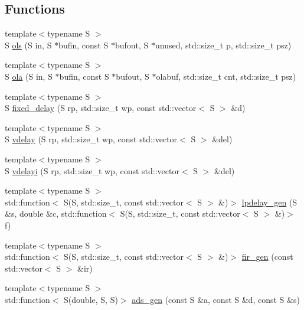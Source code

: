 \subsection*{Functions}
\begin{DoxyCompactItemize}
\item 
{\footnotesize template$<$typename S $>$ }\\S \hyperlink{namespace_aurora_a7ec189488ba66508d8df1c1670823365}{ols} (S in, S $\ast$bufin, const S $\ast$bufout, S $\ast$unused, std\+::size\+\_\+t p, std\+::size\+\_\+t psz)
\item 
{\footnotesize template$<$typename S $>$ }\\S \hyperlink{namespace_aurora_a8617b2b6ccb5009afc6b66c97435354f}{ola} (S in, S $\ast$bufin, const S $\ast$bufout, S $\ast$olabuf, std\+::size\+\_\+t cnt, std\+::size\+\_\+t psz)
\item 
{\footnotesize template$<$typename S $>$ }\\S \hyperlink{namespace_aurora_a62442f237e70fdaac1efc22b4e82e875}{fixed\+\_\+delay} (S rp, std\+::size\+\_\+t wp, const std\+::vector$<$ S $>$ \&d)
\item 
{\footnotesize template$<$typename S $>$ }\\S \hyperlink{namespace_aurora_ab93392950e0b9ae8fbbccf7cc1b55a13}{vdelay} (S rp, std\+::size\+\_\+t wp, const std\+::vector$<$ S $>$ \&del)
\item 
{\footnotesize template$<$typename S $>$ }\\S \hyperlink{namespace_aurora_a5318ddb492590ada5dc40ba80bbf655b}{vdelayi} (S rp, std\+::size\+\_\+t wp, const std\+::vector$<$ S $>$ \&del)
\item 
{\footnotesize template$<$typename S $>$ }\\std\+::function$<$ S(S, std\+::size\+\_\+t, const std\+::vector$<$ S $>$ \&)$>$ \hyperlink{namespace_aurora_a8a142312f627aaa19ba0e8a87f33d00b}{lpdelay\+\_\+gen} (S \&s, double \&c, std\+::function$<$ S(S, std\+::size\+\_\+t, const std\+::vector$<$ S $>$ \&)$>$ f)
\item 
{\footnotesize template$<$typename S $>$ }\\std\+::function$<$ S(S, std\+::size\+\_\+t, const std\+::vector$<$ S $>$ \&)$>$ \hyperlink{namespace_aurora_abf3b452f54db43f366b261c3702b0c0b}{fir\+\_\+gen} (const std\+::vector$<$ S $>$ \&ir)
\item 
{\footnotesize template$<$typename S $>$ }\\std\+::function$<$ S(double, S, S)$>$ \hyperlink{namespace_aurora_a966a076f1768216bd9c2d6a07aebf034}{ads\+\_\+gen} (const S \&a, const S \&d, const S \&s)

\end{DoxyCompactItemize}
